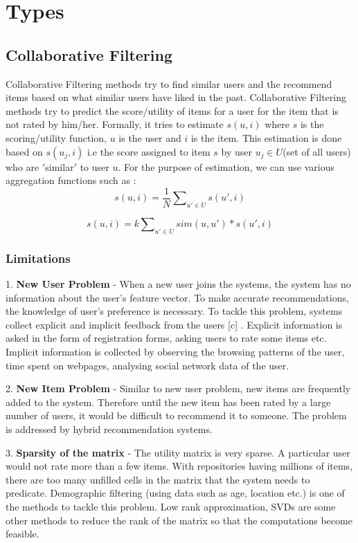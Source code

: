\section{Types}
\subsection{Collaborative Filtering}
Collaborative Filtering methods try to find similar users and the recommend items based on what similar users have liked in the past. Collaborative Filtering methods try to predict the score/utility of items for a user for the item that is not rated by him/her. Formally, it tries to estimate $s(u,i)$ where $s$ is the scoring/utility function, $u$ is the user and $i$ is the item. This estimation is done based on $s(u_j,i)$ i.e the score assigned to item $s$ by user $u_j\in U$(set of all users) who are $'$similar$'$ to user $u$. For the purpose of estimation, we can use various aggregation functions such as : 
\begin{equation}
s(u,i) = \frac{1}{N}\sum\nolimits_{u' \in U} s(u',i) 
\end{equation}

\begin{equation}
s(u,i) = k\sum\nolimits_{u' \in U} sim(u,u') * s(u',i) 
\end{equation}

\subsubsection{Limitations}

1. {\bf New User Problem} - When a new user joins the systems, the system has no information about the user's feature vector. To make accurate recommendations, the knowledge of user's preference is necessary. To tackle this problem, systems collect explicit and implicit feedback from the users [c] . Explicit information is asked in the form of registration forms, asking users to rate some items etc. Implicit information is collected by observing the browsing patterns of the user, time spent on webpages, analysing social network data of the user.

2. {\bf New Item Problem} - Similar to new user problem, new items are frequently added to the system. Therefore until the new item has been rated by a large number of users, it would be difficult to recommend it to someone. The problem is addressed by hybrid recommendation systems.

3. {\bf Sparsity of the matrix} - The utility matrix is very sparse. A particular user would not rate more than a few items. With repositories having millions of items, there are too many unfilled cells in the matrix that the system needs to predicate. Demographic filtering (using data such as age, location etc.) is one of the methods to tackle this problem. Low rank approximation, SVDs are some other methods to reduce the rank of the matrix so that the computations become feasible. 

